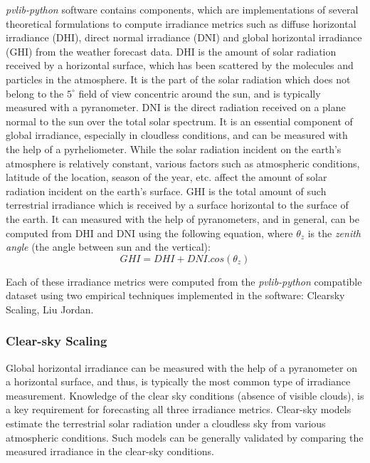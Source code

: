 \par \textit{pvlib-python} software contains components, which are implementations of several theoretical formulations to compute irradiance metrics such as diffuse horizontal irradiance (DHI), direct normal irradiance (DNI) and global horizontal irradiance (GHI) from the weather forecast data. DHI is the amount of solar radiation received by a horizontal surface, which has been scattered by the molecules and particles in the atmosphere. It is the part of the solar radiation which does not belong to the $5^{\circ}$ field of view concentric around the sun, and is typically measured with a pyranometer. DNI is the direct radiation received on a plane normal to the sun over the total solar spectrum. It is an essential component of global irradiance, especially in cloudless conditions, and can be measured with the help of a pyrheliometer. While the solar radiation incident on the earth's atmosphere is relatively constant, various factors such as atmospheric conditions, latitude of the location, season of the year, etc. affect the amount of solar radiation incident on the earth's surface. GHI is the total amount of such terrestrial irradiance which is received by a surface horizontal to the surface of the earth. It can measured with the help of pyranometers, and in general, can be computed from DHI and DNI using the following equation, where $\theta_z$ is the \textit{zenith angle} (the angle between sun and the vertical):
\begin{equation}\label{eq:ghi}
    GHI = DHI + DNI . cos(\theta_z)
\end{equation}

\par Each of these irradiance metrics were computed from the \textit{pvlib-python} compatible dataset using two empirical techniques implemented in the software: Clearsky Scaling, Liu Jordan.


\subsubsection*{Clear-sky Scaling}
\par Global horizontal irradiance can be measured with the help of a pyranometer on a horizontal surface, and thus, is typically the most common type of irradiance measurement. Knowledge of the clear sky conditions (absence of visible clouds), is a key requirement for forecasting all three irradiance metrics. Clear-sky models estimate the terrestrial solar radiation under a cloudless sky from various atmospheric conditions. Such models can be generally validated by comparing the measured irradiance in the clear-sky conditions. 

